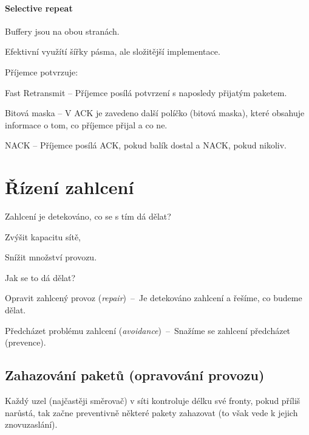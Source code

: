 \paragraph*{Selective repeat} \begin{compactitem}
    \item Buffery jsou na obou stranách.
    \item Efektivní využítí šířky pásma, ale složitější implementace.
    \item Příjemce potvrzuje: \begin{compactitem}
        \item Fast Retransmit -- Příjemce posílá potvrzení s naposledy přijatým paketem.
        \item Bitová maska -- V ACK je zavedeno další políčko (bitová maska), které obsahuje informace o tom, co příjemce přijal a co ne.
        \item NACK -- Příjemce posílá ACK, pokud balík dostal a NACK, pokud nikoliv.
    \end{compactitem}
\end{compactitem}


\section{Řízení zahlcení}

Zahlcení je detekováno, co se s tím dá dělat? \begin{compactitem}
    \item Zvýšit kapacitu sítě,
    \item Snížit množství provozu.
\end{compactitem}

\noindent Jak se to dá dělat? \begin{compactitem}
    \item Opravit zahlcený provoz (\textit{repair})~--~Je detekováno zahlcení a řešíme, co budeme dělat.
    \item Předcházet problému zahlcení (\textit{avoidance})~--~Snažíme se zahlcení předcházet (prevence).
\end{compactitem}

\subsection{Zahazování paketů (opravování provozu)}

Každý uzel (najčastěji směrovač) v síti kontroluje délku své fronty, pokud příliš narůstá, tak začne preventivně některé pakety zahazovat (to však vede k jejich znovuzaslání).

